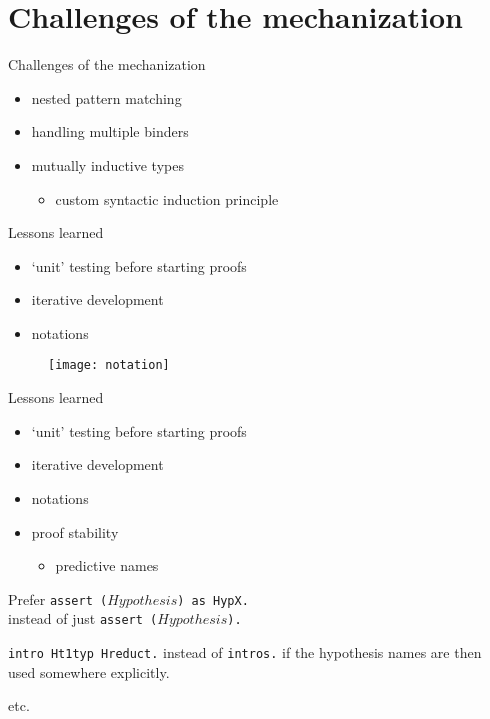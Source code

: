 \documentclass{beamer}
\begin{document}
\section{Challenges of the mechanization}
\begin{frame}{Challenges of the mechanization}
\begin{itemize}
  \item nested pattern matching
  \item handling multiple binders
  \item mutually inductive types
  \begin{itemize}
    \item custom syntactic induction principle
  \end{itemize}
\end{itemize}
\end{frame}

\begin{frame}[fragile]{Lessons learned}
\begin{itemize}
  \item `unit' testing before starting proofs
  \pause
  \item iterative development
  \pause
  \item notations
\end{itemize}
\begin{figure}
  \texttt{[image: notation]}
\end{figure}

\end{frame}

\begin{frame}[fragile]{Lessons learned}
\begin{itemize}
  \item `unit' testing before starting proofs
  \item iterative development
  \item notations
  \item proof stability
  \begin{itemize}
    \item predictive names
  \end{itemize}
\end{itemize}
Prefer \texttt{assert ($Hypothesis$) as HypX.} \\ instead of just \texttt{assert ($Hypothesis$).}

\texttt{intro Ht1typ Hreduct.} instead of \texttt{intros.} if the hypothesis names are then used somewhere explicitly.

etc.


\end{frame}
\end{document}
